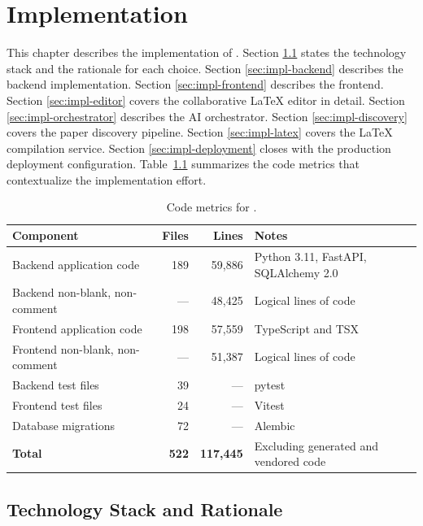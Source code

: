 \chapter{Implementation}
\label{ch:implementation}

This chapter describes the implementation of \sh{}. Section \ref{sec:impl-stack} states the technology stack and the rationale for each choice. Section \ref{sec:impl-backend} describes the backend implementation. Section \ref{sec:impl-frontend} describes the frontend. Section \ref{sec:impl-editor} covers the collaborative LaTeX editor in detail. Section \ref{sec:impl-orchestrator} describes the AI orchestrator. Section \ref{sec:impl-discovery} covers the paper discovery pipeline. Section \ref{sec:impl-latex} covers the LaTeX compilation service. Section \ref{sec:impl-deployment} closes with the production deployment configuration. Table~\ref{tab:metrics} summarizes the code metrics that contextualize the implementation effort.

\begin{table}[h]
\centering
\caption{Code metrics for \sh{}.}
\label{tab:metrics}
\small
\begin{tabularx}{\textwidth}{l r r X}
\toprule
\textbf{Component} & \textbf{Files} & \textbf{Lines} & \textbf{Notes} \\
\midrule
Backend application code & 189 & 59{,}886 & Python 3.11, FastAPI, SQLAlchemy 2.0 \\
Backend non-blank, non-comment & --- & 48{,}425 & Logical lines of code \\
Frontend application code & 198 & 57{,}559 & TypeScript and TSX \\
Frontend non-blank, non-comment & --- & 51{,}387 & Logical lines of code \\
Backend test files & 39 & --- & pytest \\
Frontend test files & 24 & --- & Vitest \\
Database migrations & 72 & --- & Alembic \\
\midrule
\textbf{Total} & \textbf{522} & \textbf{117{,}445} & Excluding generated and vendored code \\
\bottomrule
\end{tabularx}
\end{table}

\section{Technology Stack and Rationale}
\label{sec:impl-stack}

